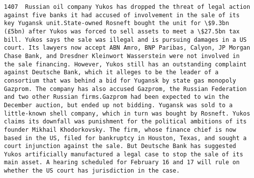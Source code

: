 \documentclass[11pt]{article}
\begin{document}
\begin{Verbatim}[commandchars=\\\{\}]
         1407  Russian oil company Yukos has dropped the threat of legal action against five banks it had accused of involvement in the sale of its key Yugansk unit.State-owned Rosneft bought the unit for \$9.3bn (£5bn) after Yukos was forced to sell assets to meet a \$27.5bn tax bill. Yukos says the sale was illegal and is pursuing damages in a US court. Its lawyers now accept ABN Amro, BNP Paribas, Calyon, JP Morgan Chase Bank, and Dresdner Kleinwort Wasserstein were not involved in the sale financing. However, Yukos still has an outstanding complaint against Deutsche Bank, which it alleges to be the leader of a consortium that was behind a bid for Yugansk by state gas monopoly Gazprom. The company has also accused Gazprom, the Russian Federation and two other Russian firms.Gazprom had been expected to win the December auction, but ended up not bidding. Yugansk was sold to a little-known shell company, which in turn was bought by Rosneft. Yukos claims its downfall was punishment for the political ambitions of its founder Mikhail Khodorkovsky. The firm, whose finance chief is now based in the US, filed for bankruptcy in Houston, Texas, and sought a court injunction against the sale. But Deutsche Bank has suggested Yukos artificially manufactured a legal case to stop the sale of its main asset. A hearing scheduled for February 16 and 17 will rule on whether the US court has jurisdiction in the case.                                                                                                                                                                                                                                                                                                                                                                                                                                                                                                                                                                                                                                                                                                                                                                                                                                                                                                                                                                                                                                                                                                                                                                                                                                                                                                                                                                                                                                                                                                                                                                                                                                                                                                                                                                                                                                                                                                                                                    
\end{Verbatim}
\end{document}
